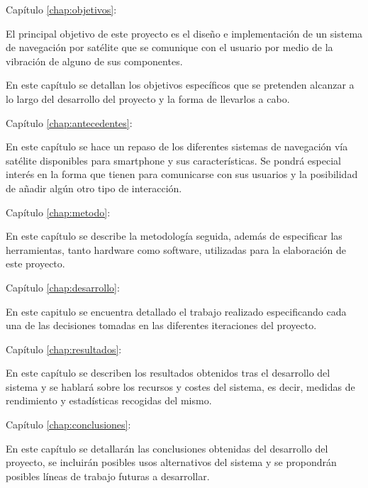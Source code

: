 \begin{definitionlist}
  \item[Capítulo \ref{chap:objetivos}: \nameref{chap:objetivos}] 

  El principal objetivo de este proyecto es el diseño e implementación de un sistema de navegación
  por satélite que se comunique con el usuario por medio de la vibración de alguno de sus
  componentes.

  En este capítulo se detallan los objetivos específicos que se pretenden alcanzar a lo largo del
  desarrollo del proyecto y la forma de llevarlos a cabo.

  \item[Capítulo \ref{chap:antecedentes}: \nameref{chap:antecedentes}]

  En este capítulo se hace un repaso de los diferentes sistemas de navegación vía satélite
  disponibles para smartphone y sus características. Se pondrá especial interés en la forma que
  tienen para comunicarse con sus usuarios y la posibilidad de añadir algún otro tipo de
  interacción.

  \item[Capítulo \ref{chap:metodo}: \nameref{chap:metodo}]

  En este capítulo se describe la metodología seguida, además de especificar las herramientas,
  tanto hardware como software, utilizadas para la elaboración de este proyecto.

  \item[Capítulo \ref{chap:desarrollo}: \nameref{chap:desarrollo}]

  En este capitulo se encuentra detallado el trabajo realizado especificando cada una de las
  decisiones tomadas en las diferentes iteraciones del proyecto.

  \item[Capítulo \ref{chap:resultados}: \nameref{chap:resultados}]

  En este capítulo se describen los resultados obtenidos tras el desarrollo del sistema y se hablará
  sobre los recursos y costes del sistema, es decir, medidas de rendimiento y estadísticas recogidas
  del mismo.

  \item[Capítulo \ref{chap:conclusiones}: \nameref{chap:conclusiones}]

  En este capítulo se detallarán las conclusiones obtenidas del desarrollo del proyecto, se
  incluirán posibles usos alternativos del sistema y se propondrán posibles líneas de trabajo
  futuras a desarrollar.

\end{definitionlist}

